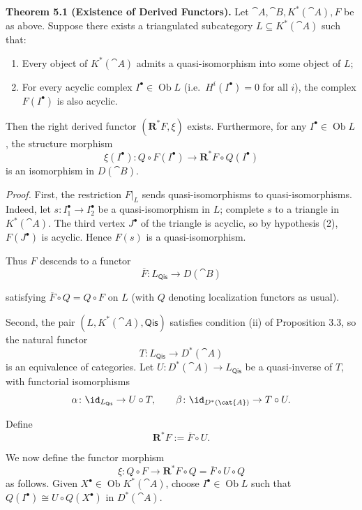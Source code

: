 \medskip
\textbf{Theorem 5.1 (Existence of Derived Functors).}
Let \(\cat{A},\cat{B},K^*(\cat{A}),F\) be as above. Suppose there exists a triangulated subcategory \(L\subseteq K^*(\cat{A})\) such that:
\begin{enumerate}
\item[(1)] Every object of \(K^*(\cat{A})\) admits a quasi-isomorphism into some object of \(L\);
\item[(2)] For every acyclic complex \(I^\bullet\in\operatorname{Ob}L\) (i.e.\ \(H^i(I^\bullet)=0\) for all \(i\)), the complex \(F(I^\bullet)\) is also acyclic.
\end{enumerate}
Then the right derived functor \((\mathbf{R}^*F,\xi)\) exists. Furthermore, for any \(I^\bullet\in\operatorname{Ob}L\), the structure morphism
\[
\xi(I^\bullet)\colon Q\circ F(I^\bullet) \to \mathbf{R}^*F\circ Q(I^\bullet)
\]
is an isomorphism in \(D(\cat{B})\).

\textit{Proof.}
First, the restriction \(F|_L\) sends quasi-isomorphisms to quasi-isomorphisms. Indeed, let \(s\colon I_1^\bullet\to I_2^\bullet\) be a quasi-isomorphism in \(L\); complete \(s\) to a triangle in \(K^*(\cat{A})\). The third vertex \(J^\bullet\) of the triangle is acyclic, so by hypothesis (2), \(F(J^\bullet)\) is acyclic. Hence \(F(s)\) is a quasi-isomorphism.

Thus \(F\) descends to a functor
\[
\overline{F}\colon L_{\mathsf{Qis}} \to D(\cat{B})
\]

\setcounter{page}{54}
satisfying \(\overline{F}\circ Q = Q\circ F\) on \(L\) (with \(Q\) denoting localization functors as usual).

Second, the pair \((L,K^*(\cat{A}),\mathsf{Qis})\) satisfies condition (ii) of Proposition 3.3, so the natural functor
\[
T\colon L_{\mathsf{Qis}} \to D^*(\cat{A})
\]
is an equivalence of categories. Let \(U\colon D^*(\cat{A})\to L_{\mathsf{Qis}}\) be a quasi-inverse of \(T\), with functorial isomorphisms
\[
\alpha\colon \id_{L_{\mathsf{Qis}}} \to U\circ T,\qquad
\beta\colon \id_{D^*(\cat{A})} \to T\circ U.
\]

Define
\[
\mathbf{R}^*F := \overline{F}\circ U.
\]

We now define the functor morphism
\[
\xi\colon Q\circ F \to \mathbf{R}^*F\circ Q = \overline{F}\circ U\circ Q
\]
as follows. Given \(X^\bullet\in\operatorname{Ob}K^*(\cat{A})\), choose \(I^\bullet\in\operatorname{Ob}L\) such that \(Q(I^\bullet)\cong U\circ Q(X^\bullet)\) in \(D^*(\cat{A})\).